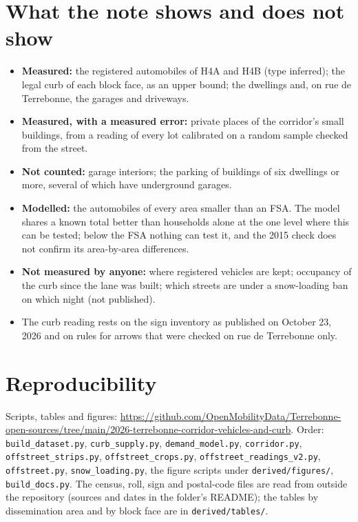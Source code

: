 \documentclass[11pt,a4paper]{article}
\begin{document}
\section{What the note shows and does not show}
\begin{itemize}
\item \textbf{Measured:} the registered automobiles of H4A and H4B (type inferred); the legal curb of each block face, as an upper bound; the dwellings and, on rue de Terrebonne, the garages and driveways.
\item \textbf{Measured, with a measured error:} private places of the corridor\textquoteright{}s small buildings, from a reading of every lot calibrated on a random sample checked from the street.
\item \textbf{Not counted:} garage interiors; the parking of buildings of six dwellings or more, several of which have underground garages.
\item \textbf{Modelled:} the automobiles of every area smaller than an FSA. The model shares a known total better than households alone at the one level where this can be tested; below the FSA nothing can test it, and the 2015 check does not confirm its area-by-area differences.
\item \textbf{Not measured by anyone:} where registered vehicles are kept; occupancy of the curb since the lane was built; which streets are under a snow-loading ban on which night (not published).
\item The curb reading rests on the sign inventory as published on October 23, 2026 and on rules for arrows that were checked on rue de Terrebonne only.
\end{itemize}

\section{Reproducibility}
Scripts, tables and figures: \url{https://github.com/OpenMobilityData/Terrebonne-open-sources/tree/main/2026-terrebonne-corridor-vehicles-and-curb}. Order: \texttt{build\_dataset.py}, \texttt{curb\_supply.py}, \texttt{demand\_model.py}, \texttt{corridor.py}, \texttt{offstreet\_strips.py}, \texttt{offstreet\_crops.py}, \texttt{offstreet\_readings\_v2.py}, \texttt{offstreet.py}, \texttt{snow\_loading.py}, the figure scripts under \texttt{derived/figures/}, \texttt{build\_docs.py}. The census, roll, sign and postal-code files are read from outside the repository (sources and dates in the folder\textquoteright{}s README); the tables by dissemination area and by block face are in \texttt{derived/tables/}.
\end{document}
